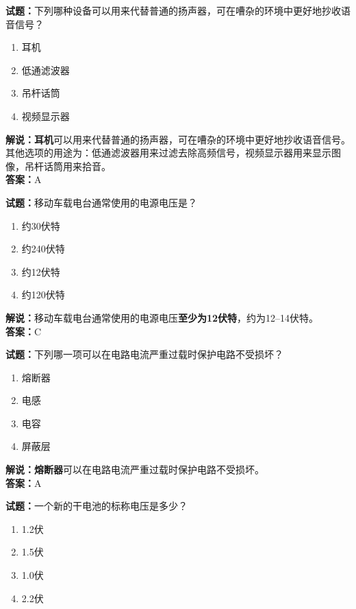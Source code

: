 \documentclass{ctexbook}
\begin{document}
\bigskip

\noindent\textbf{试题：}下列哪种设备可以用来代替普通的扬声器，可在嘈杂的环境中更好地抄收语音信号？

\begin{enumerate}[leftmargin=3em]
  \item 耳机
  \item 低通滤波器
  \item 吊杆话筒
  \item 视频显示器
\end{enumerate}

\noindent\textbf{解说：耳机}可以用来代替普通的扬声器，可在嘈杂的环境中更好地抄收语音信号。其他选项的用途为：低通滤波器用来过滤去除高频信号，视频显示器用来显示图像，吊杆话筒用来拾音。\\\noindent\textbf{答案：}A

\bigskip

\noindent\textbf{试题：}移动车载电台通常使用的电源电压是？

\begin{enumerate}[leftmargin=3em]
  \item 约\num{30}伏特
  \item 约\num{240}伏特
  \item 约\num{12}伏特
  \item 约\num{120}伏特
\end{enumerate}

\noindent\textbf{解说：}移动车载电台通常使用的电源电压\textbf{至少为\num{12}伏特}，约为\numrange{12}{14}伏特。\\\noindent\textbf{答案：}C

\bigskip

\noindent\textbf{试题：}下列哪一项可以在电路电流严重过载时保护电路不受损坏？

\begin{enumerate}[leftmargin=3em]
  \item 熔断器
  \item 电感
  \item 电容
  \item 屏蔽层
\end{enumerate}

\noindent\textbf{解说：熔断器}可以在电路电流严重过载时保护电路不受损坏。\\\noindent\textbf{答案：}A
\bigskip

\noindent\textbf{试题：}一个新的干电池的标称电压是多少？

\begin{enumerate}[leftmargin=3em]
  \item \num{1.2}伏
  \item \num{1.5}伏
  \item \num{1.0}伏
  \item \num{2.2}伏
\end{enumerate}
\end{document}
